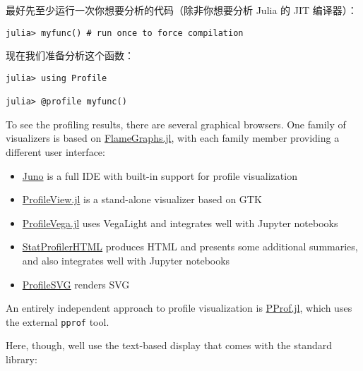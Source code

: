 最好先至少运行一次你想要分析的代码（除非你想要分析 Julia 的 JIT 编译器）：




\begin{verbatim}
julia> myfunc() # run once to force compilation
\end{verbatim}



现在我们准备分析这个函数：




\begin{verbatim}
julia> using Profile

julia> @profile myfunc()
\end{verbatim}



To see the profiling results, there are several graphical browsers. One {\textquotedbl}family{\textquotedbl} of visualizers is based on \href{https://github.com/timholy/FlameGraphs.jl}{FlameGraphs.jl}, with each family member providing a different user interface:



\begin{itemize}
\item \href{https://junolab.org/}{Juno} is a full IDE with built-in support for profile visualization


\item \href{https://github.com/timholy/ProfileView.jl}{ProfileView.jl} is a stand-alone visualizer based on GTK


\item \href{https://github.com/davidanthoff/ProfileVega.jl}{ProfileVega.jl} uses VegaLight and integrates well with Jupyter notebooks


\item \href{https://github.com/tkluck/StatProfilerHTML.jl}{StatProfilerHTML} produces HTML and presents some additional summaries, and also integrates well with Jupyter notebooks


\item \href{https://github.com/timholy/ProfileSVG.jl}{ProfileSVG} renders SVG

\end{itemize}


An entirely independent approach to profile visualization is \href{https://github.com/vchuravy/PProf.jl}{PProf.jl}, which uses the external \texttt{pprof} tool.



Here, though, we{\textquotesingle}ll use the text-based display that comes with the standard library:




